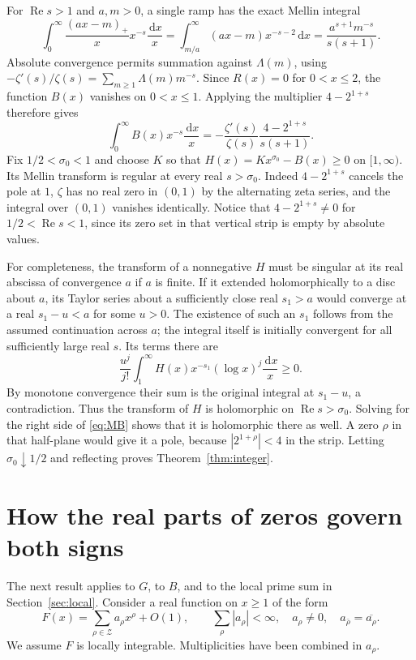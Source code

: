 \documentclass[11pt,a4paper]{article}
\newcommand{\Znt}{\mathcal Z}
\newcommand{\dd}{\,\mathrm d}
\newcommand{\Rea}{\operatorname{Re}}
\begin{document}
For $\Rea s>1$ and $a,m>0$, a single ramp has the exact Mellin integral
\[
\int_0^\infty\frac{(ax-m)_+}{x}x^{-s}\frac{\dd x}{x}
 =\int_{m/a}^\infty (ax-m)x^{-s-2}\dd x
 =\frac{a^{s+1}m^{-s}}{s(s+1)}.
\]
Absolute convergence permits summation against $\Lambda(m)$, using
$-\zeta'(s)/\zeta(s)=\sum_{m\ge1}\Lambda(m)m^{-s}$.
Since $R(x)=0$ for $0<x\le2$, the function $B(x)$ vanishes on $0<x\le1$.
Applying the multiplier $4-2^{1+s}$ therefore gives
\begin{equation}\label{eq:MB}
 \int_0^\infty B(x)x^{-s}\frac{\dd x}{x}
  =-\frac{\zeta'(s)}{\zeta(s)}\frac{4-2^{1+s}}{s(s+1)}.
\end{equation}
Fix $1/2<\sigma_0<1$ and choose $K$ so that $H(x)=Kx^{\sigma_0}-B(x)\ge0$ on $[1,\infty)$. Its Mellin transform is regular at every real $s>\sigma_0$. Indeed $4-2^{1+s}$ cancels the pole at $1$, $\zeta$ has no real zero in $(0,1)$ by the alternating zeta series, and the integral over $(0,1)$ vanishes identically. Notice that $4-2^{1+s}\ne0$ for $1/2<\Rea s<1$, since its zero set in that vertical strip is empty by absolute values.

For completeness, the transform of a nonnegative $H$ must be singular at its real abscissa of convergence $a$ if $a$ is finite. If it extended holomorphically to a disc about $a$, its Taylor series about a sufficiently close real $s_1>a$ would converge at a real $s_1-u<a$ for some $u>0$. The existence of such an $s_1$ follows from the assumed continuation across $a$; the integral itself is initially convergent for all sufficiently large real $s$. Its terms there are
\[
 \frac{u^j}{j!}\int_1^\infty H(x)x^{-s_1}(\log x)^j\frac{\dd x}{x}\ge0.
\]
By monotone convergence their sum is the original integral at $s_1-u$, a contradiction. Thus the transform of $H$ is holomorphic on $\Rea s>\sigma_0$. Solving for the right side of \eqref{eq:MB} shows that it is holomorphic there as well. A zero $\rho$ in that half-plane would give it a pole, because $|2^{1+\rho}|<4$ in the strip. Letting $\sigma_0\downarrow1/2$ and reflecting proves Theorem~\ref{thm:integer}.

\section{How the real parts of zeros govern both signs}\label{sec:gaussian}
The next result applies to $G$, to $B$, and to the local prime sum in Section~\ref{sec:local}. Consider a real function on $x\ge1$ of the form
\begin{equation}\label{eq:class}
 F(x)=\sum_{\rho\in\Znt} a_\rho x^\rho+O(1),\qquad
 \sum_\rho|a_\rho|<\infty,\quad a_\rho\ne0,\quad
 a_{\bar\rho}=\overline{a_\rho}.
\end{equation}
We assume $F$ is locally integrable. Multiplicities have been combined in $a_\rho$.
\end{document}

